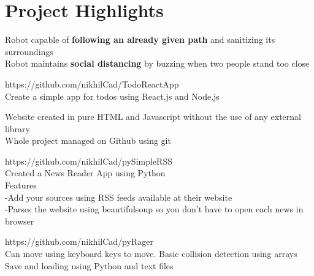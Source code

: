\documentclass[]{Resume}
\begin{document}
\section{Project Highlights}
\hrulefill


\pt Robot capable of \textbf{following an already given path} and sanitizing its surroundings \\
\pt Robot maintains \textbf{social distancing} by buzzing when two people stand too close \\
\sectionsep

\pt https://github.com/nikhilCad/TodoReactApp \\
\pt Create a simple app for todos using React.js and Node.js \\
\sectionsep

\pt Website created in pure HTML and Javascript without the use of any external library \\
\pt Whole project managed on Github using git \\
\sectionsep

\pt https://github.com/nikhilCad/pySimpleRSS \\
\pt Created a News Reader App using Python \\
\pt Features \\
\pt 	-Add your sources using RSS feeds available at their website \\
\pt 	-Parses the website using beautifulsoup so you don't have to open each news in browser \\
\sectionsep

\pt https://github.com/nikhilCad/pyRager \\
\pt Can move using keyboard keys to move. Basic collision detection using arrays \\
\pt Save and loading using Python and text files \\
\sectionsep
\end{document}
